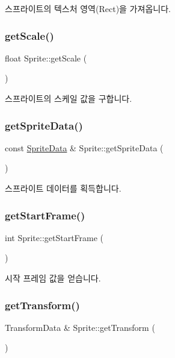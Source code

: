 스프라이트의 텍스처 영역(\+Rect)을 가져옵니다. \mbox{\label{class_sprite_a1b0aff3c4f856f0c8cf56df3d81bc7ef}} 
\subsubsection{\texorpdfstring{getScale()}{getScale()}}
{\footnotesize\ttfamily float Sprite\+::get\+Scale (\begin{DoxyParamCaption}{ }\end{DoxyParamCaption})}

스프라이트의 스케일 값을 구합니다. \mbox{\label{class_sprite_afce7986c5fb568479b044a36f4c1cbbf}} 
\subsubsection{\texorpdfstring{getSpriteData()}{getSpriteData()}}
{\footnotesize\ttfamily const \mbox{\hyperlink{struct_sprite_data}{Sprite\+Data}} \& Sprite\+::get\+Sprite\+Data (\begin{DoxyParamCaption}{ }\end{DoxyParamCaption})}

스프라이트 데이터를 획득합니다. \mbox{\label{class_sprite_a005efd7aaf18903ca8e36e6e4b7b493d}} 
\subsubsection{\texorpdfstring{getStartFrame()}{getStartFrame()}}
{\footnotesize\ttfamily int Sprite\+::get\+Start\+Frame (\begin{DoxyParamCaption}{ }\end{DoxyParamCaption})}

시작 프레임 값을 얻습니다. \mbox{\label{class_sprite_a2270ad97c4ae71ff234676e322fe5409}} 
\subsubsection{\texorpdfstring{getTransform()}{getTransform()}}
{\footnotesize\ttfamily Transform\+Data \& Sprite\+::get\+Transform (\begin{DoxyParamCaption}{ }\end{DoxyParamCaption})\hspace{0.3cm}{\ttfamily [virtual]}}

